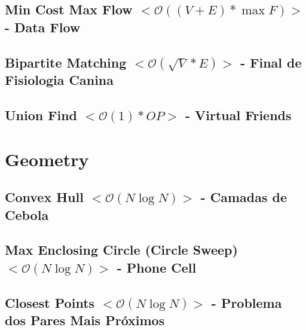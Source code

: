 \documentclass[11pt, a4paper, twoside, notitlepage]{article}
\begin{document}


\subsection{Min Cost Max Flow $<\mathcal{O}((V+E)*\max F)>$ - Data Flow}



\subsection{Bipartite Matching $<\mathcal{O}(\sqrt{V}*E)>$ - Final de Fisiologia Canina}



\subsection{Union Find $<\mathcal{O}(1)*OP>$ - Virtual Friends}



\newpage

\section{Geometry}

\subsection{Convex Hull $<\mathcal{O}(N\log N)>$ - Camadas de Cebola}



\subsection{Max Enclosing Circle (Circle Sweep) $<\mathcal{O}(N\log N)>$ - Phone Cell}



\subsection{Closest Points $<\mathcal{O}(N\log N)>$ - Problema dos Pares Mais Próximos}


\end{document}
